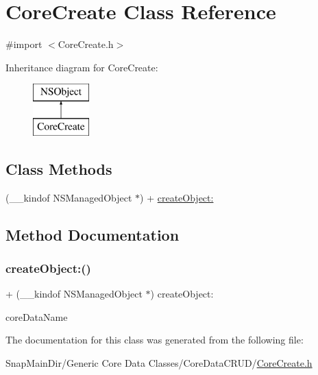 \hypertarget{interface_core_create}{}\section{Core\+Create Class Reference}
\label{interface_core_create}


{\ttfamily \#import $<$Core\+Create.\+h$>$}

Inheritance diagram for Core\+Create\+:\begin{figure}[H]
\begin{center}
\leavevmode
\includegraphics[height=2.000000cm]{interface_core_create}
\end{center}
\end{figure}
\subsection*{Class Methods}
\begin{DoxyCompactItemize}
\item 
(\+\_\+\+\_\+kindof N\+S\+Managed\+Object $\ast$) + \hyperlink{interface_core_create_aa3e56915cbc97ac871680edf6ba1bfa4}{create\+Object\+:}
\end{DoxyCompactItemize}


\subsection{Method Documentation}
\hypertarget{interface_core_create_aa3e56915cbc97ac871680edf6ba1bfa4}{}\label{interface_core_create_aa3e56915cbc97ac871680edf6ba1bfa4} 
\subsubsection{\texorpdfstring{create\+Object\+:()}{createObject:()}}
{\footnotesize\ttfamily + (\+\_\+\+\_\+kindof N\+S\+Managed\+Object $\ast$) create\+Object\+: \begin{DoxyParamCaption}\item[{(N\+S\+String $\ast$)}]{core\+Data\+Name }\end{DoxyParamCaption}}



The documentation for this class was generated from the following file\+:\begin{DoxyCompactItemize}
\item 
Snap\+Main\+Dir/\+Generic Core Data Classes/\+Core\+Data\+C\+R\+U\+D/\hyperlink{_core_create_8h}{Core\+Create.\+h}\end{DoxyCompactItemize}
